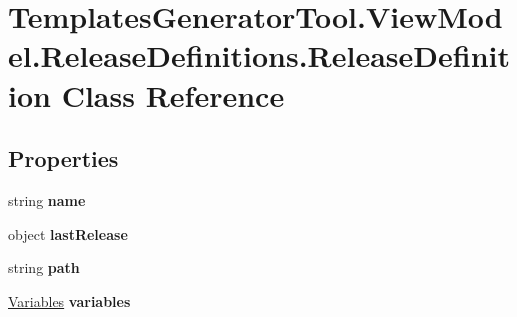 \hypertarget{class_templates_generator_tool_1_1_view_model_1_1_release_definitions_1_1_release_definition}{}\section{Templates\+Generator\+Tool.\+View\+Model.\+Release\+Definitions.\+Release\+Definition Class Reference}
\label{class_templates_generator_tool_1_1_view_model_1_1_release_definitions_1_1_release_definition}
\subsection*{Properties}
\begin{DoxyCompactItemize}
\item 
\mbox{\label{class_templates_generator_tool_1_1_view_model_1_1_release_definitions_1_1_release_definition_a6e7d0929e4f25179b8f32efd68f59a68}} 
string {\bfseries name}
\item 
\mbox{\label{class_templates_generator_tool_1_1_view_model_1_1_release_definitions_1_1_release_definition_a79e6706e08c4fcb6d1ad15772873a689}} 
object {\bfseries last\+Release}
\item 
\mbox{\label{class_templates_generator_tool_1_1_view_model_1_1_release_definitions_1_1_release_definition_a407f7f40feb041bdebaf20f7975ec48d}} 
string {\bfseries path}
\item 
\mbox{\label{class_templates_generator_tool_1_1_view_model_1_1_release_definitions_1_1_release_definition_aaa9184d7d6bc0cccc30116dfc3af4751}} 
\mbox{\hyperlink{class_templates_generator_tool_1_1_view_model_1_1_release_definitions_1_1_variables}{Variables}} {\bfseries variables}

\end{DoxyCompactItemize}
